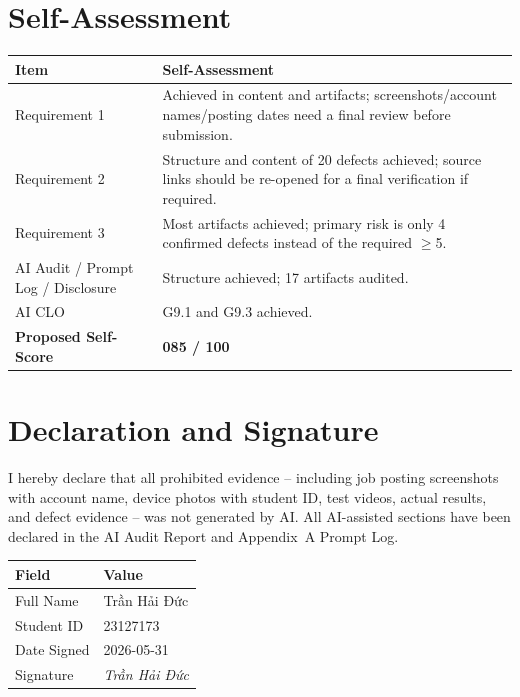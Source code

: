 \documentclass[12pt, a4paper]{article}
\begin{document}
\section{Self-Assessment}

\begin{table}[h!]
\centering
\begin{tabularx}{\textwidth}{L{4.5cm} X}
\toprule
\textbf{Item} & \textbf{Self-Assessment} \\
\midrule
Requirement 1 & Achieved in content and artifacts; screenshots/account names/posting dates need a final review before submission. \\
Requirement 2 & Structure and content of 20 defects achieved; source links should be re-opened for a final verification if required. \\
Requirement 3 & Most artifacts achieved; primary risk is only 4 confirmed defects instead of the required $\geq$5. \\
AI Audit / Prompt Log / Disclosure & Structure achieved; 17 artifacts audited. \\
AI CLO & G9.1 and G9.3 achieved. \\
\midrule
\textbf{Proposed Self-Score} & \textbf{085 / 100} \\
\bottomrule
\end{tabularx}
\end{table}

\section{Declaration and Signature}

I hereby declare that all prohibited evidence -- including job posting screenshots with account name, device photos with student ID, test videos, actual results, and defect evidence -- was not generated by AI. All AI-assisted sections have been declared in the AI Audit Report and Appendix~A Prompt Log.

\vspace{1.5cm}

\begin{table}[h!]
\centering
\begin{tabularx}{\textwidth}{L{4cm} X}
\toprule
\textbf{Field} & \textbf{Value} \\
\midrule
Full Name   & Trần Hải Đức \\
Student ID  & 23127173 \\
Date Signed & 2026-05-31 \\
Signature   & \textit{Trần Hải Đức} \\
\bottomrule
\end{tabularx}
\end{table}
\end{document}

